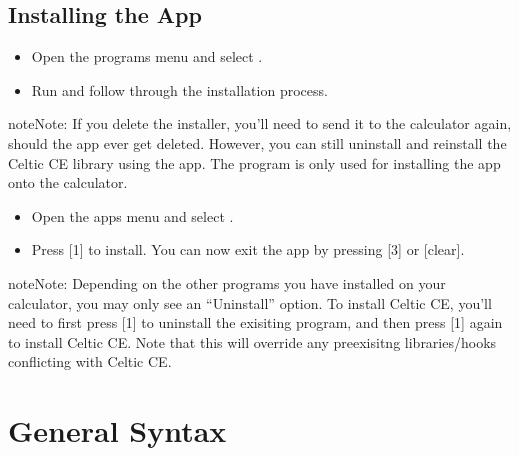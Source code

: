 \documentclass[letterpaper,10pt,english]{sphinxmanual}
\begin{document}
\subsection{Installing the App}
\label{\detokenize{installation:installing-the-app}}\begin{itemize}
\item {} 
\sphinxAtStartPar
Open the programs menu and select .

\item {} 
\sphinxAtStartPar
Run  and follow through the installation process.

\end{itemize}

\begin{sphinxadmonition}{note}{Note:}
\sphinxAtStartPar
If you delete the installer, you’ll need to send it to the calculator again, should the app ever get deleted.
However, you can still uninstall and re\sphinxhyphen{}install the Celtic CE library using the app. The program is only used for installing the app onto the calculator.
\end{sphinxadmonition}
\begin{itemize}
\item {} 
\sphinxAtStartPar
Open the apps menu and select .

\item {} 
\sphinxAtStartPar
Press {[}1{]} to install. You can now exit the app by pressing {[}3{]} or {[}clear{]}.

\end{itemize}

\begin{sphinxadmonition}{note}{Note:}
\sphinxAtStartPar
Depending on the other programs you have installed on your calculator, you may only see an “Uninstall” option.
To install Celtic CE, you’ll need to first press {[}1{]} to uninstall the exisiting program, and then press {[}1{]} again to install Celtic CE.
Note that this will override any pre\sphinxhyphen{}exisitng libraries/hooks conflicting with Celtic CE.
\end{sphinxadmonition}

\sphinxstepscope


\section{General Syntax}
\label{\detokenize{gensyntax:general-syntax}}\label{\detokenize{gensyntax::doc}}
\end{document}
